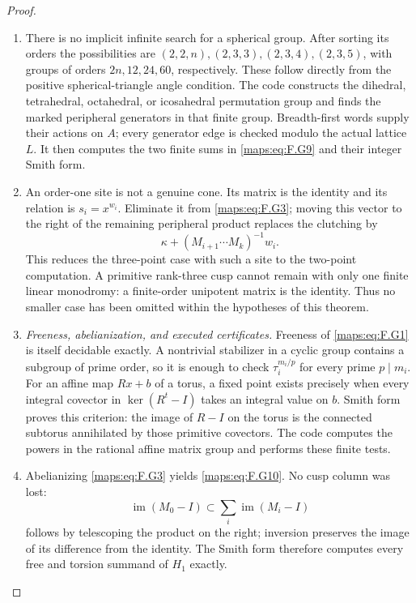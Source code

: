 \documentclass[11pt,a4paper]{article}
\theoremstyle{definition}
\begin{document}
\begin{proof}
\begin{enumerate}[label=\arabic*.]
\item There is no implicit infinite search for a spherical group.
After sorting its orders the possibilities are
$(2,2,n),(2,3,3),(2,3,4),(2,3,5)$, with groups of orders
$2n,12,24,60$, respectively.  These follow directly from
the positive spherical-triangle angle condition.
The code constructs the dihedral, tetrahedral, octahedral,
or icosahedral permutation group and finds the marked
peripheral generators in that finite group.  Breadth-first
words supply their actions on $A$; every generator edge is
checked modulo the actual lattice $L$.  It then computes
the two finite sums in \eqref{maps:eq:F.G9} and their integer Smith form.

\item An order-one site is not a genuine cone.  Its matrix is the
identity and its relation is $s_i=x^{w_i}$.  Eliminate it
from \eqref{maps:eq:F.G3}; moving this vector to the right of the remaining
peripheral product replaces the clutching by
\[
       \kappa+(M_{i+1}\cdots M_k)^{-1}w_i.                 \tag{F.G11}\label{maps:eq:F.G11}
\]
This reduces the three-point case with such a site to the
two-point computation.  A primitive rank-three cusp cannot
remain with only one finite linear monodromy: a finite-order
unipotent matrix is the identity.  Thus no smaller case has
been omitted within the hypotheses of this theorem.

\item \emph{Freeness, abelianization, and executed certificates.}
Freeness of \eqref{maps:eq:F.G1} is itself decidable exactly.  A nontrivial
stabilizer in a cyclic group contains a subgroup of prime
order, so it is enough to check $\tau_i^{m_i/p}$ for every
prime $p\mid m_i$.  For an affine map $Rx+b$ of a torus,
a fixed point exists precisely when every integral covector
in $\ker(R^t-I)$ takes an integral value on $b$.
Smith form proves this criterion: the image of $R-I$ on
the torus is the connected subtorus annihilated by those
primitive covectors.  The code computes the powers in the
rational affine matrix group and performs these finite tests.

\item Abelianizing \eqref{maps:eq:F.G3} yields \eqref{maps:eq:F.G10}.  No cusp column was lost:
\[
 \operatorname{im}(M_0-I)
       \subset\sum_i\operatorname{im}(M_i-I)
\]
follows by telescoping the product on the right; inversion
preserves the image of its difference from the identity.
The Smith form therefore computes every free and torsion
summand of $H_1$ exactly.


\end{enumerate}
\end{proof}
\end{document}

